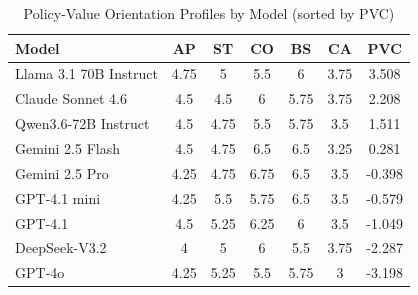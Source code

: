 \begin{table}[ht]
\centering
\caption{Policy-Value Orientation Profiles by Model (sorted by PVC)}
\label{tab:orientation-profiles}
\begin{tabular}{lcccccc}
\toprule
Model & AP & ST & CO & BS & CA & PVC \\
\midrule
Llama 3.1 70B Instruct & 4.75 & 5 & 5.5 & 6 & 3.75 & 3.508 \\
Claude Sonnet 4.6 & 4.5 & 4.5 & 6 & 5.75 & 3.75 & 2.208 \\
Qwen3.6-72B Instruct & 4.5 & 4.75 & 5.5 & 5.75 & 3.5 & 1.511 \\
Gemini 2.5 Flash & 4.5 & 4.75 & 6.5 & 6.5 & 3.25 & 0.281 \\
Gemini 2.5 Pro & 4.25 & 4.75 & 6.75 & 6.5 & 3.5 & -0.398 \\
GPT-4.1 mini & 4.25 & 5.5 & 5.75 & 6.5 & 3.5 & -0.579 \\
GPT-4.1 & 4.5 & 5.25 & 6.25 & 6 & 3.5 & -1.049 \\
DeepSeek-V3.2 & 4 & 5 & 6 & 5.5 & 3.75 & -2.287 \\
GPT-4o & 4.25 & 5.25 & 5.5 & 5.75 & 3 & -3.198 \\
\bottomrule
\end{tabular}
\end{table}

